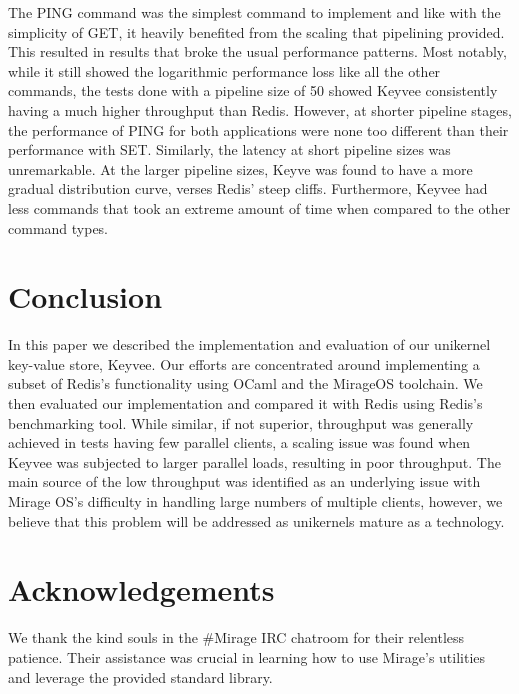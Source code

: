 \documentclass[english,10pt,twocolumn]{article}
\begin{document}
The PING command was the simplest command to implement and like with the simplicity of GET, it heavily benefited from the scaling that pipelining provided.
This resulted in results that broke the usual performance patterns.
Most notably, while it still showed the logarithmic performance loss like all the other commands, the tests done with a pipeline size of 50 showed Keyvee consistently having a much higher throughput than Redis.
However, at shorter pipeline stages, the performance of PING for both applications were none too different than their performance with SET.
Similarly, the latency at short pipeline sizes was unremarkable.
At the larger pipeline sizes, Keyve was found to have a more gradual distribution curve, verses Redis' steep cliffs.
Furthermore, Keyvee had less commands that took an extreme amount of time when compared to the other command types.

\section{Conclusion}
In this paper we described the implementation and evaluation of our unikernel key-value store, Keyvee.
Our efforts are concentrated around implementing a subset of Redis's functionality using OCaml and the MirageOS toolchain.
We then evaluated our implementation and compared it with Redis using Redis's benchmarking tool.
While similar, if not superior, throughput was generally achieved in tests having few parallel clients, a scaling issue was found when Keyvee was subjected to larger parallel loads, resulting in poor throughput.
The main source of the low throughput was identified as an underlying issue with Mirage OS's difficulty in handling large numbers of multiple clients, however, we believe that this problem will be addressed as unikernels mature as a technology.

\section{Acknowledgements}
We thank the kind souls in the \#Mirage IRC chatroom for their relentless patience.
Their assistance was crucial in learning how to use Mirage's utilities and leverage the provided standard library.





\end{document}
